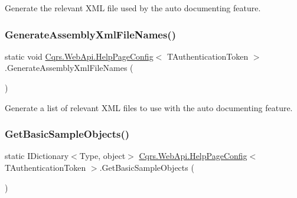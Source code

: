 Generate the relevant X\+ML file used by the auto documenting feature. 

\mbox{\label{classCqrs_1_1WebApi_1_1HelpPageConfig_afc36e0fcbf46ecda7770656373dbd46c_afc36e0fcbf46ecda7770656373dbd46c}} 
\subsubsection{\texorpdfstring{Generate\+Assembly\+Xml\+File\+Names()}{GenerateAssemblyXmlFileNames()}}
{\footnotesize\ttfamily static void \hyperlink{classCqrs_1_1WebApi_1_1HelpPageConfig}{Cqrs.\+Web\+Api.\+Help\+Page\+Config}$<$ T\+Authentication\+Token $>$.Generate\+Assembly\+Xml\+File\+Names (\begin{DoxyParamCaption}{ }\end{DoxyParamCaption})\hspace{0.3cm}{\ttfamily [static]}}



Generate a list of relevant X\+ML files to use with the auto documenting feature. 

\mbox{\label{classCqrs_1_1WebApi_1_1HelpPageConfig_a9015771102b0ab21da20a0684fe6a88a_a9015771102b0ab21da20a0684fe6a88a}} 
\subsubsection{\texorpdfstring{Get\+Basic\+Sample\+Objects()}{GetBasicSampleObjects()}}
{\footnotesize\ttfamily static I\+Dictionary$<$Type, object$>$ \hyperlink{classCqrs_1_1WebApi_1_1HelpPageConfig}{Cqrs.\+Web\+Api.\+Help\+Page\+Config}$<$ T\+Authentication\+Token $>$.Get\+Basic\+Sample\+Objects (\begin{DoxyParamCaption}{ }\end{DoxyParamCaption})\hspace{0.3cm}{\ttfamily [static]}}



